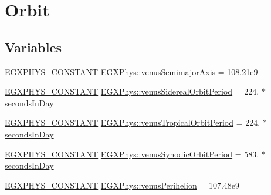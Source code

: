 \hypertarget{group___e_g_x_phys-_constants-_astrophysics-_solar_system-_venus-_orbit}{}\section{Orbit}
\label{group___e_g_x_phys-_constants-_astrophysics-_solar_system-_venus-_orbit}
\subsection*{Variables}
\begin{DoxyCompactItemize}
\item 
\mbox{\hyperlink{group___e_g_x_phys-_constants-_macros_ga76980d288494ce1714c9ac68a95ba702}{E\+G\+X\+P\+H\+Y\+S\+\_\+\+C\+O\+N\+S\+T\+A\+NT}} \mbox{\hyperlink{group___e_g_x_phys-_constants-_astrophysics-_solar_system-_venus-_orbit_ga48e1be71e507fa06dfe2887d45c7ca58}{E\+G\+X\+Phys\+::venus\+Semimajor\+Axis}} = 108.\+21e9
\item 
\mbox{\hyperlink{group___e_g_x_phys-_constants-_macros_ga76980d288494ce1714c9ac68a95ba702}{E\+G\+X\+P\+H\+Y\+S\+\_\+\+C\+O\+N\+S\+T\+A\+NT}} \mbox{\hyperlink{group___e_g_x_phys-_constants-_astrophysics-_solar_system-_venus-_orbit_ga1b748828465db4be1c9abcd05c13c3df}{E\+G\+X\+Phys\+::venus\+Sidereal\+Orbit\+Period}} = 224. $\ast$ \mbox{\hyperlink{namespace_e_g_x_phys_a93d2a00d75411b58cbf63ab3fd1f8bc2}{seconds\+In\+Day}}
\item 
\mbox{\hyperlink{group___e_g_x_phys-_constants-_macros_ga76980d288494ce1714c9ac68a95ba702}{E\+G\+X\+P\+H\+Y\+S\+\_\+\+C\+O\+N\+S\+T\+A\+NT}} \mbox{\hyperlink{group___e_g_x_phys-_constants-_astrophysics-_solar_system-_venus-_orbit_ga9a39ee94fd79a4ded9c874b9a5a9bfd1}{E\+G\+X\+Phys\+::venus\+Tropical\+Orbit\+Period}} = 224. $\ast$ \mbox{\hyperlink{namespace_e_g_x_phys_a93d2a00d75411b58cbf63ab3fd1f8bc2}{seconds\+In\+Day}}
\item 
\mbox{\hyperlink{group___e_g_x_phys-_constants-_macros_ga76980d288494ce1714c9ac68a95ba702}{E\+G\+X\+P\+H\+Y\+S\+\_\+\+C\+O\+N\+S\+T\+A\+NT}} \mbox{\hyperlink{group___e_g_x_phys-_constants-_astrophysics-_solar_system-_venus-_orbit_gafec48d2c348296d02e7ada88c20edac6}{E\+G\+X\+Phys\+::venus\+Synodic\+Orbit\+Period}} = 583. $\ast$ \mbox{\hyperlink{namespace_e_g_x_phys_a93d2a00d75411b58cbf63ab3fd1f8bc2}{seconds\+In\+Day}}
\item 
\mbox{\hyperlink{group___e_g_x_phys-_constants-_macros_ga76980d288494ce1714c9ac68a95ba702}{E\+G\+X\+P\+H\+Y\+S\+\_\+\+C\+O\+N\+S\+T\+A\+NT}} \mbox{\hyperlink{group___e_g_x_phys-_constants-_astrophysics-_solar_system-_venus-_orbit_ga667ee7c48f891d77e7ae9358e144e03e}{E\+G\+X\+Phys\+::venus\+Perihelion}} = 107.\+48e9

\end{DoxyCompactItemize}
